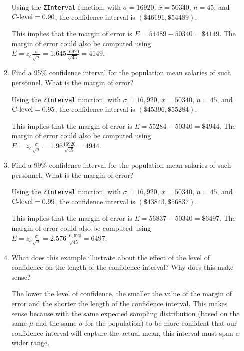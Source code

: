 \begin{enumerate}
\begin{enumerate}
	{\answer Using the \texttt{ZInterval} function, with $\sigma = 16920$, $\bar{x} = 50340$, $n=45$, and $\textnormal{C-level} = 0.90$, the confidence interval is $(\$46191, \$54489)$. 
	
	This implies that the margin of error is $E = 54489 - 50340 = \$4149$. 
	The margin of error could also be computed using $\displaystyle E = z_c\frac{\sigma}{\sqrt{n}} = 1.645\frac{16920}{\sqrt{45}} = 4149$.
	} 

	\item Find a 95\% confidence interval for the population mean salaries of such personnel. What is the margin of error? 
	
	{\answer Using the \texttt{ZInterval} function, with $\sigma = 16,920$, $\bar{x} = 50340$, $n=45$, and $\textnormal{C-level} = 0.95$, the confidence interval is $(\$45396, \$55284)$. 
	
	This implies that the margin of error is $E = 55284 - 50340 = \$4944$. 
	The margin of error could also be computed using $\displaystyle E = z_c\frac{\sigma}{\sqrt{n}} = 1.96\frac{16920}{\sqrt{45}} =4944$.
	} 

	\item Find a 99\% confidence interval for the population mean salaries of such personnel. What is the margin of error? 
	
	{\answer Using the \texttt{ZInterval} function, with $\sigma = 16,920$, $\bar{x} = 50340$, $n=45$, and $\textnormal{C-level} = 0.99$, the confidence interval is $(\$43843, \$56837)$. 
	
	This implies that the margin of error is $E = 56837 - 50340 = \$6497$. 
	The margin of error could also be computed using $\displaystyle E = z_c\frac{\sigma}{\sqrt{n}} = 2.576\frac{16,920}{\sqrt{45}} = 6497$.
	} 

	\item What does this example illustrate about the effect of the level of confidence on the length of the confidence interval? Why does this make sense? 
	
	{\answer The lower the level of confidence, the smaller the value of the margin of error and the shorter the length of the confidence interval. This makes sense because with the same expected sampling distribution (based on the same $\mu$ and the same $\sigma$ for the population) to be more confident that our confidence interval will capture the actual mean, this interval must span a wider range.
	} 
	\end{enumerate}


\end{enumerate}

\vfill
